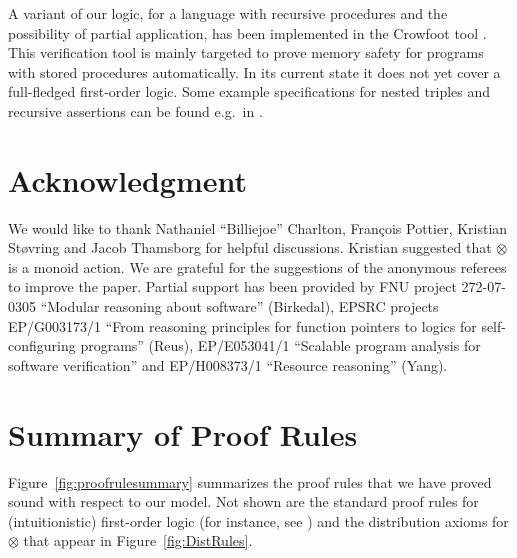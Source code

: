 \documentclass{LMCS}
\theoremstyle{remark}
\begin{document}
A variant of our logic, for a language with recursive procedures and the possibility of partial application, has been implemented in the Crowfoot tool \cite{Crowfoot11}.  This verification tool is mainly targeted to prove memory safety for programs with stored procedures automatically. In its current state it does not yet cover a full-fledged first-order logic. Some example specifications for nested triples and recursive assertions can be found e.g.\ in \cite{Charlton:Reus:11}.
 




 \section*{Acknowledgment}
We would like to thank 
Nathaniel ``Billiejoe'' Charlton, Fran\c{c}ois Pottier, Kristian St{\o}vring and Jacob Thamsborg for helpful discussions. Kristian suggested that $\otimes$ is a monoid action. We are grateful for the suggestions of the anonymous referees to improve the paper.
Partial support has been provided by FNU project 272-07-0305
 ``Modular reasoning about software'' (Birkedal), EPSRC  projects  EP/G003173/1 
``From reasoning principles for function pointers to logics for self-configuring programs'' (Reus),
EP/E053041/1 ``Scalable program analysis for software verification'' 
and EP/H008373/1 ``Resource reasoning'' (Yang). 







\newpage
\appendix
\section{Summary of Proof Rules}
Figure~\ref{fig:proofrulesummary} summarizes the proof rules that we have proved sound with respect to our model. 
Not shown are the standard proof rules for (intuitionistic) first-order logic (for instance, see \cite{Sorensen:Urzyczyn:06}) 
and the distribution axioms for $\otimes$ that appear in Figure~\ref{fig:DistRules}. 
\end{document}
